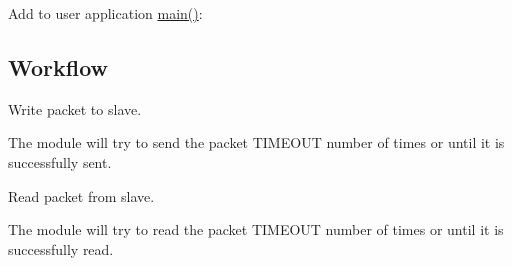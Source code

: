 Add to user application {\ttfamily \mbox{\hyperlink{csc__app_8c_a840291bc02cba5474a4cb46a9b9566fe}{main()}}}\+: 
\begin{DoxyCodeInclude}{0}
\end{DoxyCodeInclude}
 \hypertarget{asfdoc_sam0_sercom_i2c_master_basic_use_case_asfdoc_sam0_sercom_i2c_master_basic_use_implemenation_workflow}{}\subsection{Workflow}\label{asfdoc_sam0_sercom_i2c_master_basic_use_case_asfdoc_sam0_sercom_i2c_master_basic_use_implemenation_workflow}

\begin{DoxyEnumerate}
\item Write packet to slave. 
\begin{DoxyCodeInclude}{0}
\end{DoxyCodeInclude}
The module will try to send the packet T\+I\+M\+E\+O\+UT number of times or until it is successfully sent.
\item Read packet from slave. 
\begin{DoxyCodeInclude}{0}
\end{DoxyCodeInclude}
The module will try to read the packet T\+I\+M\+E\+O\+UT number of times or until it is successfully read. 
\end{DoxyEnumerate}